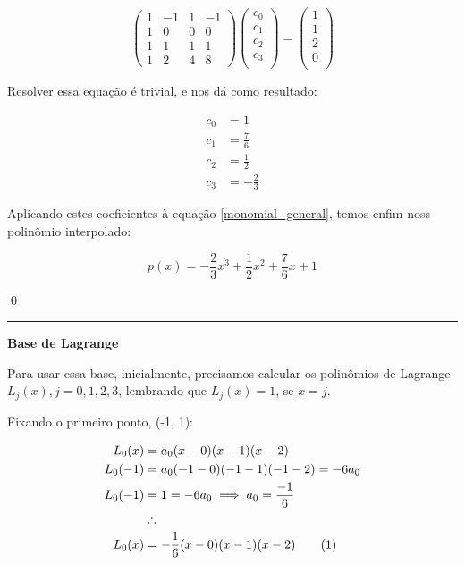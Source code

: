 \documentclass[9.5pt,reqno,a4paper]{amsart}
\newcommand\numberthis{\addtocounter{equation}{1}\tag{\theequation}}
\begin{document}
\begin{equation*}
\begin{pmatrix}
1 & -1 & 1 & -1 \\
1 & 0 & 0 & 0 \\
1 & 1 & 1 & 1 \\
1 & 2 & 4 & 8
\end{pmatrix}
\begin{pmatrix}
c_0\\
c_1\\
c_2\\
c_3\\
\end{pmatrix}
=
\begin{pmatrix}
1\\
1\\
2\\
0\\
\end{pmatrix}
\end{equation*}

\bigskip
\bigskip
Resolver essa equação é trivial, e nos dá como resultado:

\begin{align*}
    c_0 &= 1\\
    c_1 & = \frac{7}{6}\\
    c_2 & = \frac{1}{2}\\
    c_3 & = -\frac{2}{3}
\end{align*}

\bigskip
Aplicando estes coeficientes à equação \eqref{monomial_general}, temos enfim noss polinômio interpolado:

\begin{equation*}
    p(x) = -\frac{2}{3}x^3 + \frac{1}{2}x^2 + \frac{7}{6}x + 1
\end{equation*}

\qed\null

\bigskip
\noindent\rule{\textwidth}{0.4pt}
\textbf{Base de Lagrange}

Para usar essa base, inicialmente, precisamos calcular os polinômios de Lagrange $L_j(x), j= 0, 1, 2, 3$, lembrando que $L_j(x) = 1$, se $x = j$.

\medskip
Fixando o primeiro ponto, (-1, 1):

\begin{align*}
    L_0(x)  &= a_0(x-0)(x-1)(x-2) \\
    L_0(-1) &= a_0(-1-0)(-1-1)(-1-2) = -6a_0 \\
    L_0(-1) &= 1 = -6a_0 \implies a_0 = \frac{-1}{6}\\
    &\therefore\\
    L_0(x) &= -\frac{1}{6}(x-0)(x-1)(x-2) \numberthis \label{l_0}
\end{align*}
\end{document}
